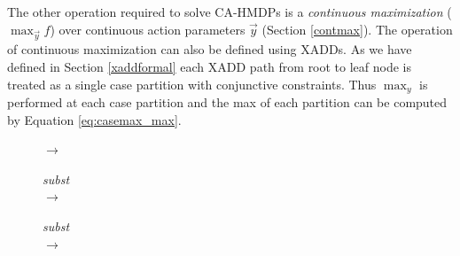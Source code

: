 \documentclass[twoside,11pt]{article}
\begin{document}
The other operation required to solve CA-HMDPs is a \emph{continuous maximization} ($\max_{\vec{y}} f$) over continuous action parameters $\vec{y}$ (Section \ref{contmax}). 
The operation of continuous maximization can also be defined using XADDs. As we have defined in Section \ref{xaddformal} each XADD path from root to
leaf node is treated as a single case partition with conjunctive constraints. Thus $\max_y$ is performed at each case partition
and the max of each partition can be computed by Equation \ref{eq:casemax_max}.


 \begin{figure}
 \centering
 \begin{minipage}{0.15\linewidth}
 \centering
 
 \end{minipage}
 \begin{minipage}{0.6cm}
 $\rightarrow$
 \end{minipage}
 \begin{minipage}{0.09\linewidth}
 \centering
 
 \end{minipage}
 \begin{minipage}{0.8cm}
 \centering

 \vspace{14mm}

 \end{minipage}
 \begin{minipage}{0.09\linewidth}
 \centering

 \vspace{-15mm}

 

 \vspace{15mm}

 
 \end{minipage}
 \begin{minipage}{1.3cm}
 \centering
 \small
 \vspace{-10mm}
 \emph{subst}\\
 $\rightarrow$

 \vspace{20mm}

 \emph{subst}\\
 $\rightarrow$
 \end{minipage}
 \begin{minipage}{0.10\linewidth}
 \centering


\end{minipage}
\end{figure}
\end{document}
